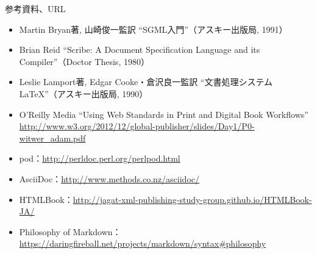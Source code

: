 \begin{frame}[containsverbatim, t]{\inhibitglue 参考資料、URL}
  \sffamily
  \footnotesize

  \begin{itemize}
    \item Martin Bryan著, 山崎俊一監訳 ``SGML入門''（アスキー出版局, 1991）
    \item Brian Reid ``Scribe: A Document Specification Language and its Compiler''（Doctor Thesis, 1980）
    \item Leslie Lamport著, Edgar Cooke・倉沢良一監訳 ``文書処理システム\LaTeX ''（アスキー出版局, 1990）
    \item O'Reilly Media ``Using Web Standards in Print and Digital Book Workflows'' \url{http://www.w3.org/2012/12/global-publisher/slides/Day1/P0-witwer_adam.pdf}
  \end{itemize}

  \begin{itemize}
    \item pod：\url{http://perldoc.perl.org/perlpod.html}
    \item AsciiDoc：\url{http://www.methods.co.nz/asciidoc/}
    \item HTMLBook：\url{http://jagat-xml-publishing-study-group.github.io/HTMLBook-JA/}
    \item Philosophy of Markdown：\url{https://daringfireball.net/projects/markdown/syntax#philosophy}
  \end{itemize}

\end{frame}


